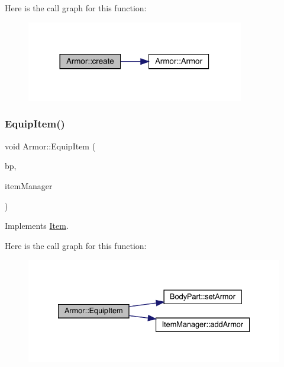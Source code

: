 Here is the call graph for this function\+:
\nopagebreak
\begin{figure}[H]
\begin{center}
\leavevmode
\includegraphics[width=269pt]{d9/d76/class_armor_a21de0acaa6ecdb6f5937166b83da9b01_cgraph}
\end{center}
\end{figure}
\mbox{\label{class_armor_a0b5dc1feb7b5d3c4bd023cf9e0857fe3}} 
\subsubsection{\texorpdfstring{Equip\+Item()}{EquipItem()}}
{\footnotesize\ttfamily void Armor\+::\+Equip\+Item (\begin{DoxyParamCaption}\item[{\mbox{\hyperlink{class_body_part}{Body\+Part}} \&}]{bp,  }\item[{\mbox{\hyperlink{class_item_manager}{Item\+Manager}} \&}]{item\+Manager }\end{DoxyParamCaption})\hspace{0.3cm}{\ttfamily [virtual]}}



Implements \mbox{\hyperlink{class_item_ad1a25684e25e0fc14cbe88f77ea035c2}{Item}}.

Here is the call graph for this function\+:
\nopagebreak
\begin{figure}[H]
\begin{center}
\leavevmode
\includegraphics[width=334pt]{d9/d76/class_armor_a0b5dc1feb7b5d3c4bd023cf9e0857fe3_cgraph}
\end{center}
\end{figure}
\mbox{\label{class_armor_a2ac47305b38298494fae82c69c935fba}} 
